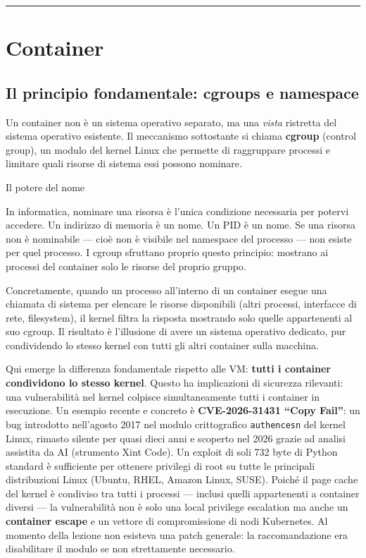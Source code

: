 \documentclass[
  italian,
  openany]{book}
\begin{document}
\begin{center}\rule{0.5\linewidth}{0.5pt}\end{center}

\section{Container}\label{container}

\subsection{Il principio fondamentale: cgroups e
namespace}\label{il-principio-fondamentale-cgroups-e-namespace}

Un container non è un sistema operativo separato, ma una \emph{vista}
ristretta del sistema operativo esistente. Il meccanismo sottostante si
chiama \textbf{cgroup} (control group), un modulo del kernel Linux che
permette di raggruppare processi e limitare quali risorse di sistema
essi possono nominare.

\begin{callouttip}{Il potere del nome}

In informatica, nominare una risorsa è l'unica condizione necessaria per
potervi accedere. Un indirizzo di memoria è un nome. Un PID è un nome.
Se una risorsa non è nominabile --- cioè non è visibile nel namespace
del processo --- non esiste per quel processo. I cgroup sfruttano
proprio questo principio: mostrano ai processi del container solo le
risorse del proprio gruppo.

\end{callouttip}

Concretamente, quando un processo all'interno di un container esegue una
chiamata di sistema per elencare le risorse disponibili (altri processi,
interfacce di rete, filesystem), il kernel filtra la risposta mostrando
solo quelle appartenenti al suo cgroup. Il risultato è l'illusione di
avere un sistema operativo dedicato, pur condividendo lo stesso kernel
con tutti gli altri container sulla macchina.

Qui emerge la differenza fondamentale rispetto alle VM: \textbf{tutti i
container condividono lo stesso kernel}. Questo ha implicazioni di
sicurezza rilevanti: una vulnerabilità nel kernel colpisce
simultaneamente tutti i container in esecuzione. Un esempio recente e
concreto è \textbf{CVE-2026-31431 ``Copy Fail''}: un bug introdotto
nell'agosto 2017 nel modulo crittografico \texttt{authencesn} del kernel
Linux, rimasto silente per quasi dieci anni e scoperto nel 2026 grazie
ad analisi assistita da AI (strumento Xint Code). Un exploit di soli 732
byte di Python standard è sufficiente per ottenere privilegi di root su
tutte le principali distribuzioni Linux (Ubuntu, RHEL, Amazon Linux,
SUSE). Poiché il page cache del kernel è condiviso tra tutti i processi
--- inclusi quelli appartenenti a container diversi --- la vulnerabilità
non è solo una local privilege escalation ma anche un \textbf{container
escape} e un vettore di compromissione di nodi Kubernetes. Al momento
della lezione non esisteva una patch generale: la raccomandazione era
disabilitare il modulo se non strettamente necessario.
\end{document}
